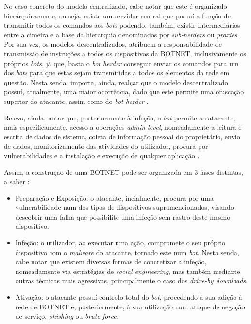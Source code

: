 No caso concreto do modelo centralizado, cabe notar que este é organizado hierárquicamente, ou seja, existe um servidor central que possuí a função de transmitir todos os comandos aos \textit{bots} podendo, também, existir intermediários entre a cimeira e a base da hierarquia denominados por \textit{sub-herders} ou \textit{proxies}. Por sua vez, os modelos descentralizados, atribuem a responsabilidade de transmissão de instruções a todos os dispositivos da BOTNET, inclusivamente os próprios \textit{bots}, já que, basta o \textit{bot herder} conseguir enviar os comandos para um dos \textit{bots} para que estas sejam transmitidas a todos os elementos da rede em questão. Nesta senda, importa, ainda, realçar que o modelo descentralizado possuí, atualmente, uma maior ocorrência, dado que este permite uma ofuscação superior do atacante, assim como do \textit{bot herder} \cite{kaspersky_botnets_2017}.


Releva, ainda, notar que, posteriormente à infeção, o \textit{bot} permite ao atacante, mais especificamente, acesso a operações \textit{admin-level}, nomeadamente a leitura e escrita de dados de sistema, coleta de informação pessoal do proprietário, envio de dados, monitorizamento das atividades do utilizador, procura por vulnerabilidades e a instalação e execução de qualquer aplicação \cite{kaspersky_botnets_2017}.

Assim, a construção de uma BOTNET pode ser organizada em 3 fases distintas, a saber \cite{kaspersky_botnets_2017}:
\begin{itemize}
    \item Preparação e Exposição: o atacante, incialmente, procura por uma vulnerabilidade num dos tipos de dispositivos supramencionados, visando descobrir uma falha que possibilite uma infeção sem rastro deste mesmo dispositivo.
    \item Infeção: o utilizador, ao executar uma ação, compromete o seu próprio dispositivo com o \textit{malware} do atacante, tornado este num \textit{bot}. Nesta senda, cabe notar que existem diversas formas de concretizar a infeção, nomeadamente via estratégias de \textit{social engineering}, mas também mediante outras técnicas mais agressivas, principalmente o caso dos \textit{drive-by downloads}.
    \item Ativação: o atacante possuí controlo total do \textit{bot}, procedendo à sua adição à rede de BOTNET e, posteriormente, à sua utilização num ataque de negação de serviço, \textit{phishing} ou \textit{brute force}.
\end{itemize}

